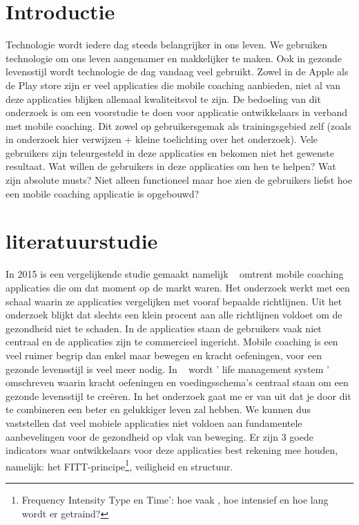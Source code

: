
\section{Introductie} %
\label{sec:introductie}
Technologie wordt iedere dag steeds belangrijker in ons leven. We gebruiken technologie om ons leven aangenamer en makkelijker te maken. Ook in gezonde levensstijl wordt technologie de dag vandaag veel gebruikt. Zowel in de Apple als de Play store zijn er veel applicaties die mobile coaching aanbieden, niet al van deze applicaties blijken allemaal kwaliteitsvol te zijn. \hfill \break \break
De bedoeling van dit onderzoek is om een voorstudie te doen voor applicatie ontwikkelaars in verband met mobile coaching. Dit zowel op gebruikersgemak als trainingsgebied zelf (zoals in onderzoek hier verwijzen + kleine toelichting over het onderzoek). Vele gebruikers zijn teleurgesteld in deze applicaties en bekomen niet het gewenste resultaat. Wat willen de gebruikers in deze applicaties om hen te helpen? Wat zijn absolute musts? Niet alleen functioneel maar hoe zien de gebruikers liefst hoe een mobile coaching applicatie is opgebouwd?



\section{literatuurstudie }
\label{sec:state-of-the-art}
In 2015 is een vergelijkende studie gemaakt namelijk ~\autocite{JMIR2015} omtrent mobile coaching applicaties die om dat moment op de markt waren. Het onderzoek werkt met een schaal waarin ze applicaties vergelijken met vooraf bepaalde richtlijnen. Uit het onderzoek blijkt dat slechts een klein procent aan alle richtlijnen voldoet om de gezondheid niet te schaden. In de applicaties staan de gebruikers vaak niet centraal en de applicaties zijn te commercieel ingericht. \break
\break
Mobile coaching is een veel ruimer begrip dan enkel maar bewegen en kracht oefeningen, voor een gezonde levensstijl is veel meer nodig. In ~\autocite{EQUILIBRIO2005} wordt ' life management system ' omschreven waarin kracht oefeningen en voedingsschema's centraal staan om een gezonde levensstijl te creëren. In het onderzoek gaat me er van uit dat je door dit te combineren een beter en gelukkiger leven zal hebben. \break
 \break
We kunnen dus vaststellen dat veel mobiele applicaties niet voldoen aan fundamentele aanbevelingen voor de gezondheid op vlak van beweging. Er zijn 3 goede indicators waar ontwikkelaars voor deze applicaties best rekening mee houden, namelijk: het FITT-principe\footnote{Frequency Intensity Type en Time’: hoe vaak , hoe intensief en hoe lang wordt er getraind?
}, veiligheid en structuur.

